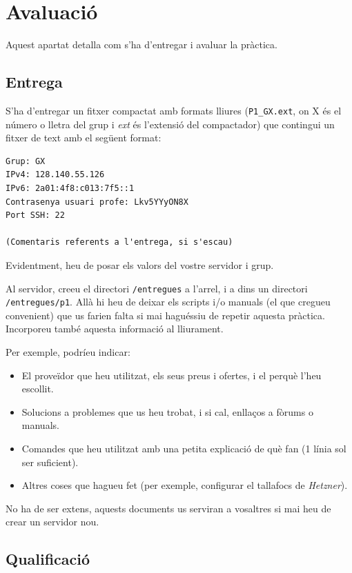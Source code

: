 \documentclass{practicaitic}
\begin{document}
\section{Avaluació}

Aquest apartat detalla com s'ha d'entregar i avaluar la pràctica.

\subsection{Entrega}
\label{sec:entrega}

S'ha d'entregar un fitxer compactat amb formats lliures (\texttt{P1\_GX.ext}, on X és el número o 
lletra del grup i \emph{ext} és l'extensió del compactador) que contingui un fitxer de text amb el següent format:

\begin{verbatim}
Grup: GX
IPv4: 128.140.55.126
IPv6: 2a01:4f8:c013:7f5::1
Contrasenya usuari profe: Lkv5YYyON8X
Port SSH: 22

(Comentaris referents a l'entrega, si s'escau)
\end{verbatim}

Evidentment, heu de posar els valors del vostre servidor i grup.

Al servidor, creeu el directori
\texttt{/entregues} a l'arrel, i a dins un directori
\texttt{/entregues/p1}. Allà hi heu de deixar els scripts i/o manuals
(el que cregueu convenient) que us farien falta si mai haguéssiu de
repetir aquesta pràctica. Incorporeu també aquesta informació al lliurament.

Per exemple, podríeu indicar:
\begin{itemize}
  \item El proveïdor que heu utilitzat, els seus preus i ofertes, i el perquè l'heu escollit.
  \item Solucions a problemes que us heu trobat, i si cal, enllaços a fòrums o manuals.
  \item Comandes que heu utilitzat amb una petita explicació de què fan (1 línia sol ser suficient).
  \item Altres coses que hagueu fet (per exemple, configurar el tallafocs de \textit{Hetzner}).
\end{itemize}

No ha de ser extens, aquests documents us serviran a vosaltres si mai heu de
crear un servidor nou.

\subsection{Qualificació}
\end{document}

